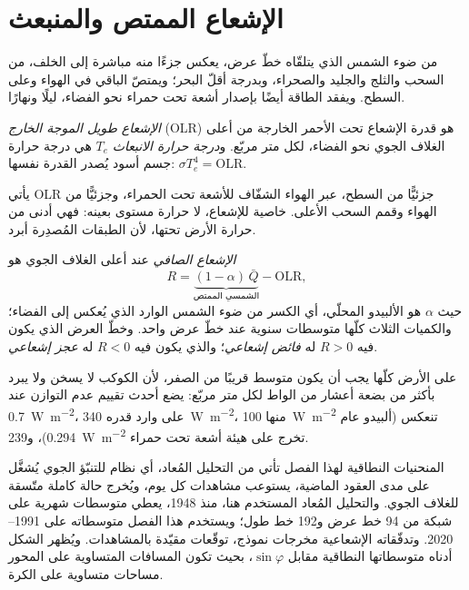 \section{الإشعاع الممتص والمنبعث}\label{sec:b1:radiation-heat-transport:toa}

من ضوء الشمس الذي يتلقّاه خطّ عرض، يعكس جزءًا منه مباشرة إلى الخلف، من السحب والثلج والجليد والصحراء، وبدرجة أقلّ البحر؛ ويمتصّ الباقي في الهواء وعلى السطح. ويفقد الطاقة أيضًا بإصدار أشعة تحت حمراء نحو الفضاء، ليلًا ونهارًا.

\begin{definition}\label{def:b1:radiation-heat-transport:olr}
\emph{الإشعاع طويل الموجة الخارج} (OLR) هو قدرة الإشعاع تحت الأحمر الخارجة من أعلى الغلاف الجوي نحو الفضاء، لكل متر مربّع. و\emph{درجة حرارة الانبعاث}
$T_e$ هي درجة حرارة جسم أسود يُصدر القدرة نفسها: $\sigma T_e^4 = \text{OLR}$.
\end{definition}

يأتي OLR جزئيًّا من السطح، عبر الهواء الشفّاف للأشعة تحت الحمراء، وجزئيًّا من الهواء وقمم السحب الأعلى.  خاصية للإشعاع، لا حرارة مستوى بعينه: فهي أدنى من حرارة الأرض تحتها، لأن الطبقات المُصدِرة أبرد.

\begin{definition}\label{def:b1:radiation-heat-transport:net-radiation}
\emph{الإشعاع الصافي} عند أعلى الغلاف الجوي هو
\[
  R = \underbrace{(1 - \alpha)\,\bar Q}_{\text{الشمسي الممتص}} - \text{OLR},
\]
حيث $\alpha$ هو الألبيدو المحلّي، أي الكسر من ضوء الشمس الوارد الذي يُعكس إلى الفضاء؛ والكميات الثلاث كلّها متوسطات سنوية عند خطّ عرض واحد. وخطّ العرض الذي يكون فيه
$R > 0$ له \emph{فائض إشعاعي}؛ والذي يكون فيه $R < 0$ له \emph{عجز إشعاعي}.
\end{definition}

على الأرض كلّها يجب أن يكون متوسط  قريبًا من الصفر، لأن الكوكب لا يسخن ولا يبرد بأكثر من بضعة أعشار من الواط لكل متر مربّع: يضع أحدث تقييم عدم التوازن عند \qty{0.7}{W.m^{-2}}، على وارد قدره \qty{340}{W.m^{-2}}، منها \qty{100}{W.m^{-2}} تنعكس (ألبيدو عام \num{0.294})، و\qty{239}{W.m^{-2}} تخرج على هيئة أشعة تحت حمراء.

المنحنيات النطاقية لهذا الفصل تأتي من التحليل المُعاد، أي نظام للتنبّؤ الجوي يُشغَّل على مدى العقود الماضية، يستوعب مشاهدات كل يوم، ويُخرج حالة كاملة متّسقة للغلاف الجوي. والتحليل المُعاد المستخدم هنا، منذ 1948، يعطي متوسطات شهرية على شبكة من 94 خط عرض و\num{192} خط طول؛ ويستخدم هذا الفصل متوسطاته على 1991--2020. وتدفّقاته الإشعاعية مخرجات نموذج، توقّعات مقيّدة بالمشاهدات. ويُظهر الشكل أدناه متوسطاتها النطاقية مقابل $\sin\varphi$، بحيث تكون المسافات المتساوية على المحور مساحات متساوية على الكرة.

